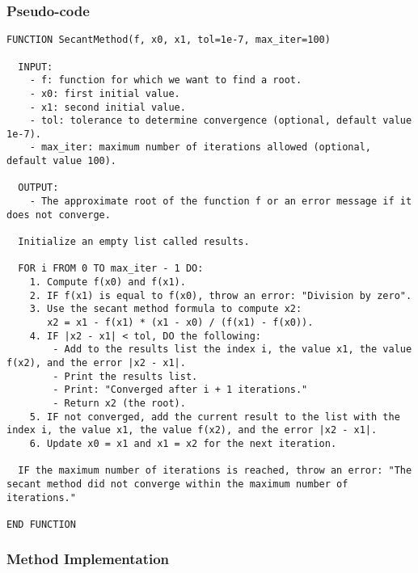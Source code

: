 \documentclass{article}
\begin{document}
        \subsubsection{Pseudo-code}
        \begin{lstlisting}
FUNCTION SecantMethod(f, x0, x1, tol=1e-7, max_iter=100)

  INPUT:
    - f: function for which we want to find a root.
    - x0: first initial value.
    - x1: second initial value.
    - tol: tolerance to determine convergence (optional, default value 1e-7).
    - max_iter: maximum number of iterations allowed (optional, default value 100).

  OUTPUT:
    - The approximate root of the function f or an error message if it does not converge.

  Initialize an empty list called results.

  FOR i FROM 0 TO max_iter - 1 DO:
    1. Compute f(x0) and f(x1).
    2. IF f(x1) is equal to f(x0), throw an error: "Division by zero".
    3. Use the secant method formula to compute x2:
       x2 = x1 - f(x1) * (x1 - x0) / (f(x1) - f(x0)).
    4. IF |x2 - x1| < tol, DO the following:
        - Add to the results list the index i, the value x1, the value f(x2), and the error |x2 - x1|.
        - Print the results list.
        - Print: "Converged after i + 1 iterations."
        - Return x2 (the root).
    5. IF not converged, add the current result to the list with the index i, the value x1, the value f(x2), and the error |x2 - x1|.
    6. Update x0 = x1 and x1 = x2 for the next iteration.

  IF the maximum number of iterations is reached, throw an error: "The secant method did not converge within the maximum number of iterations."

END FUNCTION
\end{lstlisting}

        \subsubsection{Method Implementation}
\end{document}
